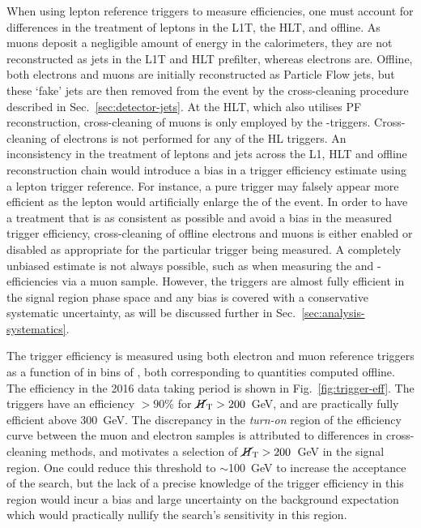 When using lepton reference triggers to measure efficiencies, one must account 
for differences in the treatment of leptons in the L1T, the HLT, and offline. 
As muons deposit a negligible amount of energy in the calorimeters, they are 
not reconstructed as jets in the L1T and HLT prefilter, whereas electrons are. 
Offline, both electrons and muons are initially reconstructed as Particle Flow 
jets, but these `fake' jets are then removed from the event 
by the cross-cleaning procedure described in Sec.~\ref{sec:detector-jets}.
At the HLT, which also utilises PF reconstruction, 
cross-cleaning of muons is only employed by the \met-\mht triggers.
Cross-cleaning of electrons is not performed for any of the HL triggers.
An inconsistency in the treatment of leptons and jets across the L1, HLT and 
offline reconstruction chain would introduce a bias in a trigger efficiency 
estimate using a lepton trigger reference. For instance, a pure \scalht trigger 
may falsely appear more efficient as the lepton would artificially enlarge the 
\scalht of the event.
In order to have a treatment that is as consistent as possible and avoid a bias 
in the measured trigger efficiency, cross-cleaning of offline electrons and 
muons is either enabled or disabled as appropriate for the particular trigger 
being measured.
A completely unbiased estimate is not always possible, such as when measuring 
the \scalht and \scalht-\alphat efficiencies via a muon sample. However, the 
triggers are almost fully efficient in the signal region phase space and any 
bias is covered with a conservative systematic uncertainty, as will be 
discussed further in Sec.~\ref{sec:analysis-systematics}.

The trigger efficiency is measured using both electron and muon reference 
triggers as a function of \mht in bins of \scalht, 
both corresponding to quantities computed offline. The efficiency in the 2016 
data taking period is shown in Fig.~\ref{fig:trigger-eff}. The triggers have an 
efficiency $>90$\% for $\mbox{$\cancel{H}_\text{T}$}>200$~GeV, and are practically fully efficient 
above 300~GeV. The discrepancy in the \textit{turn-on} region of the efficiency 
curve between the muon and electron samples is attributed to differences in 
cross-cleaning methods, and motivates a selection of $\mbox{$\cancel{H}_\text{T}$}>200$~GeV in the 
signal region. One could reduce this threshold to $\sim$100~GeV to increase the 
acceptance of the search, but the lack of a precise knowledge of the trigger 
efficiency in this region would incur a bias and large uncertainty on the 
background expectation which would practically nullify the search's sensitivity 
in this region.


